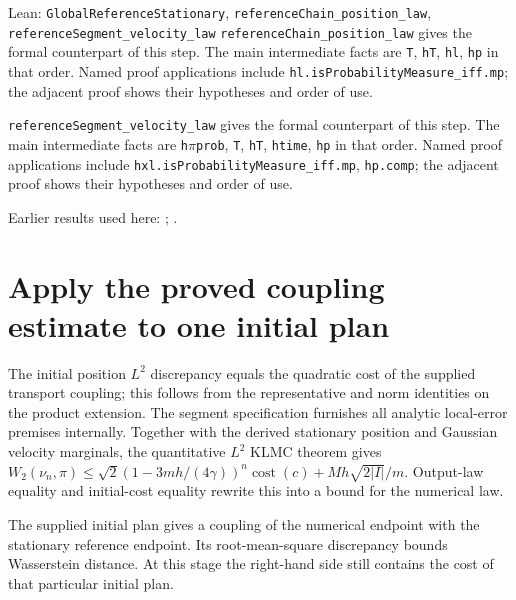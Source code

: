 \documentclass[11pt,a4paper]{article}
\begin{document}
\begin{leanbox}{Lean: \texttt{GlobalReferenceStationary}, \texttt{referenceChain\_\allowbreak{}position\_\allowbreak{}law}, \texttt{referenceSegment\_\allowbreak{}velocity\_\allowbreak{}law}}
\texttt{reference\allowbreak{}Chain\_\allowbreak{}position\_\allowbreak{}law} gives the formal counterpart of this step. The main intermediate facts are \texttt{T}, \texttt{h\allowbreak{}T}, \texttt{hl}, \texttt{hp} in that order. Named proof applications include \texttt{hl.\allowbreak{}is\allowbreak{}Probability\allowbreak{}Measure\_\allowbreak{}iff.\allowbreak{}mp}; the adjacent proof shows their hypotheses and order of use.




\texttt{reference\allowbreak{}Segment\_\allowbreak{}velocity\_\allowbreak{}law} gives the formal counterpart of this step. The main intermediate facts are \texttt{h\ensuremath{\pi}prob}, \texttt{T}, \texttt{h\allowbreak{}T}, \texttt{htime}, \texttt{hp} in that order. Named proof applications include \texttt{hxl.\allowbreak{}is\allowbreak{}Probability\allowbreak{}Measure\_\allowbreak{}iff.\allowbreak{}mp}, \texttt{hp.\allowbreak{}comp}; the adjacent proof shows their hypotheses and order of use.
\end{leanbox}


Earlier results used here: \cite[Section~3.17.1]{LangevinLean2026ULASC}; \cite[Section~3.22.6]{LangevinLean2026ULASC}.

\section{\texorpdfstring{Apply the proved coupling estimate to one initial plan}{Apply the proved coupling estimate to one initial plan}}


The initial position \(L^{2}\) discrepancy equals the quadratic cost of the supplied transport coupling; this follows from the representative and norm identities on the product extension. The segment specification furnishes all analytic local-error premises internally. Together with the derived stationary position and Gaussian velocity marginals, the quantitative \(L^{2}\) KLMC theorem gives \(W_2(\nu_n,\pi)\le\sqrt2(1-3mh/(4\gamma))^n\operatorname{cost}(c)+Mh\sqrt{2|I|}/m\). Output-law equality and initial-cost equality rewrite this into a bound for the numerical law.



The supplied initial plan gives a coupling of the numerical endpoint with the stationary reference endpoint. Its root-mean-square discrepancy bounds Wasserstein distance. At this stage the right-hand side still contains the cost of that particular initial plan.
\end{document}
